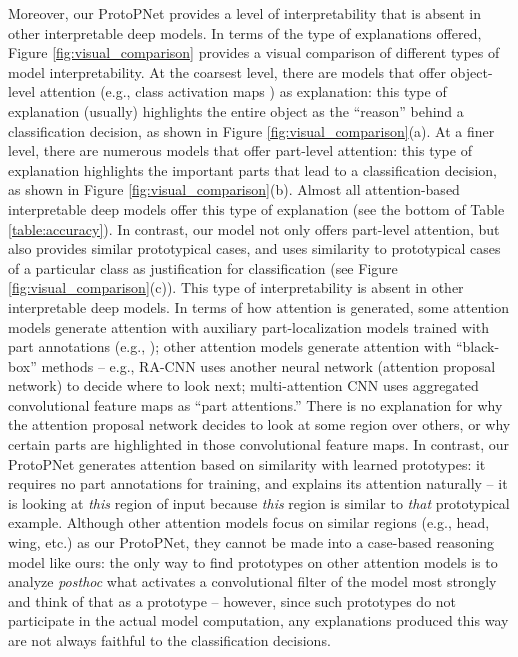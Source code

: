 \documentclass{article}
\theoremstyle{definition}
\theoremstyle{remark}
\begin{document}
Moreover, our ProtoPNet provides a level of interpretability that is absent in other interpretable deep models. In terms of the type of explanations offered, Figure \ref{fig:visual_comparison} provides a visual comparison of different types of model interpretability. At the coarsest level, there are models that offer object-level attention (e.g., class activation maps \cite{zhou2016learning}) as explanation: this type of explanation (usually) highlights the entire object as the ``reason'' behind a classification decision, as shown in Figure \ref{fig:visual_comparison}(a). At a finer level, there are numerous models that offer part-level attention: this type of explanation highlights the important parts that lead to a classification decision, as shown in Figure \ref{fig:visual_comparison}(b). Almost all attention-based interpretable deep models offer this type of explanation (see the bottom of Table \ref{table:accuracy}). In contrast, our model not only offers part-level attention, but also provides similar prototypical cases, and uses similarity to prototypical cases of a particular class as justification for classification (see Figure \ref{fig:visual_comparison}(c)). This type of interpretability is absent in other interpretable deep models. In terms of how attention is generated, some attention models generate attention with auxiliary part-localization models trained with part annotations (e.g., \cite{zhang2014part,zhang2016spda,branson2014bird,lin2015deep,huang2016part}); other attention models generate attention with ``black-box'' methods -- e.g., RA-CNN \cite{fu2017look} uses another neural network (attention proposal network) to decide where to look next; multi-attention CNN \cite{zheng2017learning} uses aggregated convolutional feature maps as ``part attentions.'' There is no explanation for why the attention proposal network decides to look at some region over others, or why certain parts are highlighted in those convolutional feature maps. In contrast, our ProtoPNet generates attention based on similarity with learned prototypes: it requires no part annotations for training, and explains its attention naturally -- it is looking at \textit{this} region of input because \textit{this} region is similar to \textit{that} prototypical example. Although other attention models focus on similar regions (e.g., head, wing, etc.) as our ProtoPNet, they cannot be made into a case-based reasoning model like ours: the only way to find prototypes on other attention models is to analyze \textit{posthoc} what activates a convolutional filter of the model most strongly and think of that as a prototype -- however, since such prototypes do not participate in the actual model computation, any explanations produced this way are not always faithful to the classification decisions.
\end{document}
